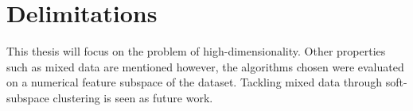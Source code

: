 \documentclass[../report.tex]{subfiles}
\begin{document}
\section{Delimitations}
This thesis will focus on the problem of high-dimensionality. Other properties such as mixed data are mentioned however, the algorithms chosen were evaluated on a numerical feature subspace of the dataset. Tackling mixed data through soft-subspace clustering is seen as future work.
\end{document}
